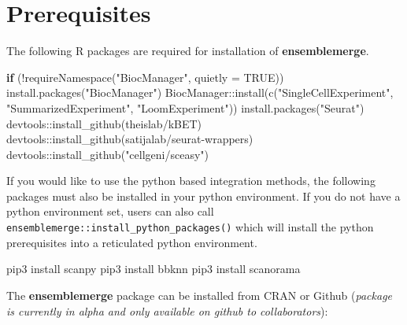\documentclass[
]{book}
\newenvironment{Shaded}{\begin{snugshade}}{\end{snugshade}}
\newcommand{\AttributeTok}[1]{\textcolor[rgb]{0.77,0.63,0.00}{#1}}
\newcommand{\ConstantTok}[1]{\textcolor[rgb]{0.00,0.00,0.00}{#1}}
\newcommand{\ControlFlowTok}[1]{\textcolor[rgb]{0.13,0.29,0.53}{\textbf{#1}}}
\newcommand{\FunctionTok}[1]{\textcolor[rgb]{0.00,0.00,0.00}{#1}}
\newcommand{\NormalTok}[1]{#1}
\newcommand{\SpecialCharTok}[1]{\textcolor[rgb]{0.00,0.00,0.00}{#1}}
\newcommand{\StringTok}[1]{\textcolor[rgb]{0.31,0.60,0.02}{#1}}
\begin{document}
\hypertarget{prerequisites}{%
\section{Prerequisites}\label{prerequisites}}

The following R packages are required for installation of \textbf{ensemblemerge}.

\begin{Shaded}
\begin{Highlighting}[]
\ControlFlowTok{if}\NormalTok{ (}\SpecialCharTok{!}\FunctionTok{requireNamespace}\NormalTok{(}\StringTok{"BiocManager"}\NormalTok{, }\AttributeTok{quietly =} \ConstantTok{TRUE}\NormalTok{))}
    \FunctionTok{install.packages}\NormalTok{(}\StringTok{"BiocManager"}\NormalTok{)}
\NormalTok{BiocManager}\SpecialCharTok{::}\FunctionTok{install}\NormalTok{(}\FunctionTok{c}\NormalTok{(}\StringTok{"SingleCellExperiment"}\NormalTok{, }\StringTok{"SummarizedExperiment"}\NormalTok{, }\StringTok{"LoomExperiment"}\NormalTok{))}
\FunctionTok{install.packages}\NormalTok{(}\StringTok{"Seurat"}\NormalTok{)}
\NormalTok{devtools}\SpecialCharTok{::}\FunctionTok{install\_github}\NormalTok{(}\StringTok{\textquotesingle{}theislab/kBET\textquotesingle{}}\NormalTok{)}
\NormalTok{devtools}\SpecialCharTok{::}\FunctionTok{install\_github}\NormalTok{(}\StringTok{\textquotesingle{}satijalab/seurat{-}wrappers\textquotesingle{}}\NormalTok{)}
\NormalTok{devtools}\SpecialCharTok{::}\FunctionTok{install\_github}\NormalTok{(}\StringTok{"cellgeni/sceasy"}\NormalTok{)}
\end{Highlighting}
\end{Shaded}

If you would like to use the python based integration methods, the following packages must also be installed in your python environment. If you do not have a python environment set, users can also call \texttt{ensemblemerge::install\_python\_packages()} which will install the python prerequisites into a reticulated python environment.

\begin{Shaded}
\begin{Highlighting}[]
\NormalTok{pip3 install scanpy}
\NormalTok{pip3 install bbknn}
\NormalTok{pip3 install scanorama}
\end{Highlighting}
\end{Shaded}

The \textbf{ensemblemerge} package can be installed from CRAN or Github (\emph{package is currently in alpha and only available on github to collaborators}):
\end{document}
